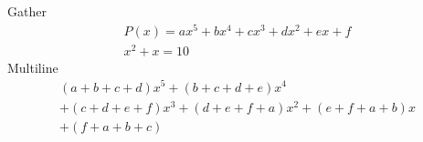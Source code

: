 \documentclass[a4paper]{article}
\begin{document}
Gather
\begin{gather}
P(x)=ax^{5}+bx^{4}+cx^{3}+dx^{2}+ex +f\\
x^2+x=10
\end{gather}
Multiline
\begin{multline*}
(a+b+c+d)x^{5}+(b+c+d+e)x^{4} \\
 +(c+d+e+f)x^{3}+(d+e+f+a)x^{2}+(e+f+a+b)x\\
 + (f+a+b+c)
\end{multline*}
 
\end{document}
